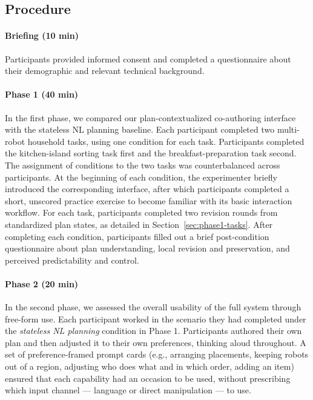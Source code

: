 \subsection{Procedure}

\paragraph{Briefing (10 min)}
Participants provided informed consent and completed a questionnaire about their demographic and relevant technical background.

\paragraph{Phase 1 (40 min)}
In the first phase, we compared our plan-contextualized co-authoring interface with the stateless NL planning baseline.
Each participant completed two multi-robot household tasks, using one condition for each task.
Participants completed the kitchen-island sorting task first and the breakfast-preparation task second.
The assignment of conditions to the two tasks was counterbalanced across participants.
At the beginning of each condition, the experimenter briefly introduced the corresponding interface, after which participants completed a short, unscored practice exercise to become familiar with its basic interaction workflow.
For each task, participants completed two revision rounds from standardized plan states, as detailed in Section~\ref{sec:phase1-tasks}.
After completing each condition, participants filled out a brief post-condition questionnaire about plan understanding, local revision and preservation, and perceived predictability and control.

\paragraph{Phase 2 (20 min)}
In the second phase, we assessed the overall usability of the full system through free-form use.
Each participant worked in the scenario they had completed under the \emph{stateless NL planning} condition in Phase 1.
Participants authored their own plan and then adjusted it to their own preferences, thinking aloud throughout.
A set of preference-framed prompt cards (e.g., arranging placements, keeping robots out of a region, adjusting who does what and in which order, adding an item) ensured that each capability had an occasion to be used, without prescribing which input channel --- language or direct manipulation --- to use.

